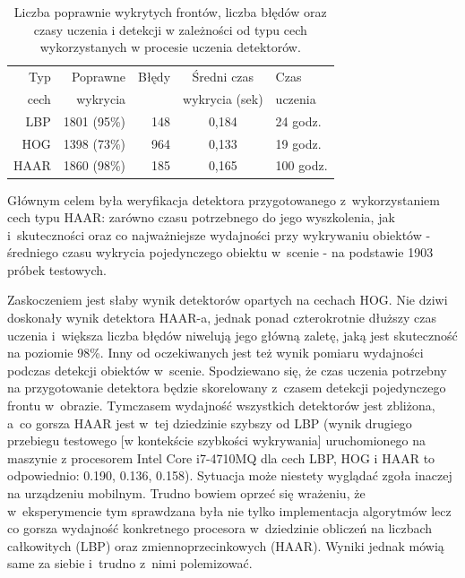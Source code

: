 \begin{table}[!h]
	\centering                                                          
	\caption{Liczba poprawnie wykrytych frontów, liczba błędów oraz czasy uczenia 
		i detekcji w zależności od typu cech wykorzystanych w procesie uczenia 
		detektorów.}
	\begin{tabular}{r|r|r|c|l}
		Typ    & Poprawne     & Błędy  & Średni czas    & Czas     \\
		cech   & wykrycia     &        & wykrycia (sek) & uczenia  \\
		\hline
		LBP        & 1801 (95\%)  & 148    & 0,184   & 24 godz.\\
		HOG        & 1398 (73\%)  & 964    & 0,133   & 19 godz.\\
		HAAR       & 1860 (98\%)  & 185    & 0,165   & 100 godz.\\
	\end{tabular} 
	\label{tab:cpu_comparison}
\end{table}

Głównym celem była weryfikacja detektora przygotowanego z~wykorzystaniem
cech typu HAAR: zarówno czasu potrzebnego do jego wyszkolenia, jak i~skuteczności
oraz co najważniejsze wydajności przy wykrywaniu obiektów - średniego czasu 
wykrycia pojedynczego obiektu w~scenie - na podstawie 1903 próbek testowych.

Zaskoczeniem jest słaby wynik detektorów opartych na cechach HOG. Nie dziwi doskonały
wynik detektora HAAR-a, jednak ponad czterokrotnie dłuższy czas uczenia i~większa 
liczba błędów niwelują jego główną zaletę, jaką jest skuteczność na poziomie 98\%.
Inny od oczekiwanych jest też wynik pomiaru wydajności podczas detekcji obiektów
w~scenie. Spodziewano się, że czas uczenia potrzebny na przygotowanie detektora
będzie skorelowany z~czasem detekcji pojedynczego frontu w~obrazie.
Tymczasem wydajność wszystkich detektorów jest zbliżona, a~co 
gorsza HAAR jest w~tej dziedzinie szybszy od LBP
(wynik drugiego przebiegu testowego [w kontekście szybkości wykrywania] 
uruchomionego na maszynie
z procesorem Intel Core i7-4710MQ dla cech LBP, HOG i HAAR to odpowiednio: 0.190, 
0.136, 0.158). Sytuacja może niestety wyglądać zgoła inaczej na urządzeniu
mobilnym. Trudno bowiem oprzeć się wrażeniu, że w~eksperymencie tym
sprawdzana była nie tylko implementacja algorytmów lecz co gorsza 
wydajność konkretnego procesora w~dziedzinie obliczeń na liczbach całkowitych
(LBP) oraz zmiennoprzecinkowych (HAAR). Wyniki jednak mówią same za
siebie i~trudno z~nimi polemizować.

